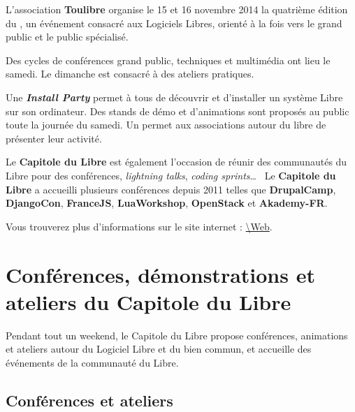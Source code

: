 \documentclass{cdl_sponsor}
\begin{document}

\begin{Introduction}

L'association \textbf{Toulibre} organise le \textcolor{Cdl}{15 et 16 novembre 2014} la quatrième édition du \textbf{}, un événement consacré aux Logiciels Libres, orienté à la fois vers le grand public et le public spécialisé.

\Separateur

Des cycles de conférences grand public, techniques et multimédia ont lieu le samedi. Le dimanche est consacré à des ateliers pratiques.

\Separateur

Une \textbf{\textit{Install Party}} permet à tous de découvrir et d'installer un système Libre sur son ordinateur. Des stands de démo et d'animations sont proposés au public toute la journée du samedi. Un \textbf{} permet aux associations autour du libre de présenter leur activité.

\Separateur

Le \textbf{Capitole du Libre} est également l'occasion de réunir des communautés du Libre pour des conférences, \textit{lightning talks}, \textit{coding sprints}\dots ~ Le \textbf{Capitole du Libre} a accueilli plusieurs conférences depuis 2011 telles que \textbf{DrupalCamp}, \textbf{DjangoCon},  \textbf{FranceJS}, \textbf{LuaWorkshop}, \textbf{OpenStack} et \textbf{Akademy-FR}.

\Separateur

Vous trouverez plus d'informations sur le site internet : \url{\Web}.
\end{Introduction}

\section{Conférences, démonstrations et ateliers du Capitole du Libre}

Pendant tout un weekend, le Capitole du Libre propose conférences, animations et ateliers autour du Logiciel Libre et du bien commun, et accueille des événements de la communauté du Libre.

\subsection{Conférences et ateliers}
\end{document}

